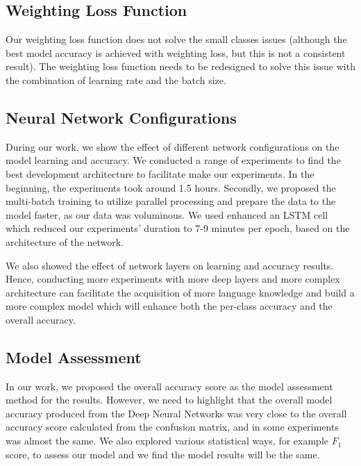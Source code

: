 \subsection{Weighting Loss Function}
Our weighting loss function does not solve the small classes issues (although the best model accuracy is achieved with weighting loss, but this is not a consistent result). The weighting loss function needs to be redesigned to solve this issue with the combination of learning rate and the batch size.

\subsection{Neural Network Configurations}

During our work, we show the effect of different network configurations on the model learning and accuracy. We conducted a range of experiments to find the best development architecture to facilitate make our experiments. In the beginning, the experiments took around 1.5 hours. Secondly, we proposed the multi-batch training to utilize parallel processing and prepare the data to the model faster, as our data was voluminous. We used enhanced an LSTM cell which reduced our experiments’ duration to 7-9 minutes per epoch, based on the architecture of the network.


We also showed the effect of network layers on learning and accuracy results. Hence, conducting more experiments with more deep layers and more complex architecture can facilitate the acquisition of more language knowledge and build a more complex model which will enhance both the per-class accuracy and the overall accuracy.

\subsection{Model Assessment}
In our work, we proposed the overall accuracy score as the model assessment method for the results. However, we need to highlight that the overall model accuracy produced from the Deep Neural Networks was very close to the overall accuracy score calculated from the confusion matrix, and in some experiments was almost the same. We also explored various statistical ways, for example $F_1$ score, to assess our model and we find the model results will be the same.


